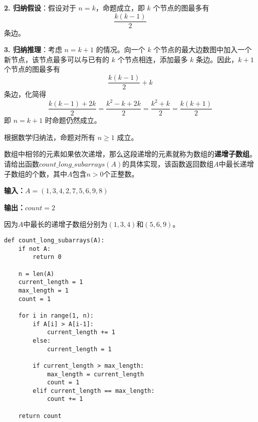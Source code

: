 \documentclass[12pt,twoside]{article}
\begin{document}
\begin{problems}
\textbf{2. 归纳假设}：假设对于 $n=k$，命题成立，即 $k$ 个节点的图最多有  
\[
\frac{k(k-1)}{2}
\]  
条边。  

\textbf{3. 归纳推理}：考虑 $n=k+1$ 的情况。向一个 $k$ 个节点的最大边数图中加入一个新节点，该节点最多可以与已有的 $k$ 个节点相连，添加最多 $k$ 条边。因此，$k+1$ 个节点的图最多有  
\[
\frac{k(k-1)}{2} + k
\]  
条边，化简得  
\[
\frac{k(k-1) + 2k}{2} = \frac{k^2 - k + 2k}{2} = \frac{k^2 + k}{2} = \frac{k(k+1)}{2}
\]  
即 $n=k+1$ 时命题仍然成立。  

根据数学归纳法，命题对所有 $n \geq 1$ 成立。

\newpage
\problem  %
数组中相邻的元素如果依次递增，那么这段递增的元素就称为数组的\textbf{递增子数组}。请给出函数$count\_long\_subarrays(A)$的具体实现，该函数返回数组$A$中最长递增子数组的个数，其中$A$包含$n>0$个正整数。

\textbf{输入：}$A=(1, 3, 4, 2, 7, 5, 6, 9, 8)$

\textbf{输出：}$count = 2$

因为$A$中最长的递增子数组分别为$(1, 3, 4)$和$(5, 6, 9)$。

\begin{lstlisting}
def count_long_subarrays(A):
    if not A:
        return 0
    
    n = len(A)
    current_length = 1
    max_length = 1
    count = 1
    
    for i in range(1, n):
        if A[i] > A[i-1]:
            current_length += 1
        else:
            current_length = 1
        
        if current_length > max_length:
            max_length = current_length
            count = 1
        elif current_length == max_length:
            count += 1
    
    return count
\end{lstlisting}



\end{problems}
\end{document}
